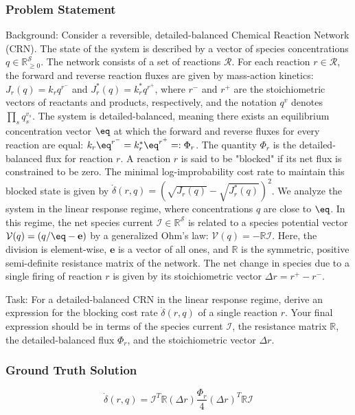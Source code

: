 \documentclass[10pt]{article}
\begin{document}
\subsubsection*{Problem Statement}
Background:
Consider a reversible, detailed-balanced Chemical Reaction Network (CRN). The state of the system is described by a vector of species concentrations $q \in \mathbb{R}^{\mathcal{S}}_{\ge 0}$. The network consists of a set of reactions $\mathcal{R}$. For each reaction $r \in \mathcal{R}$, the forward and reverse reaction fluxes are given by mass-action kinetics: $J_r(q) = k_r q^{r^-}$ and $J_r^*(q) = k_r^* q^{r^+}$, where $r^-$ and $r^+$ are the stoichiometric vectors of reactants and products, respectively, and the notation $q^{v}$ denotes $\prod_s q_s^{v_s}$. The system is detailed-balanced, meaning there exists an equilibrium concentration vector $\eq$ at which the forward and reverse fluxes for every reaction are equal: $k_r \eq^{r^-} = k_r^* \eq^{r^+} =: \Phi_r$. The quantity $\Phi_r$ is the detailed-balanced flux for reaction $r$. A reaction $r$ is said to be "blocked" if its net flux is constrained to be zero. The minimal log-improbability cost rate to maintain this blocked state is given by $\dot{\delta}(r,q) = (\sqrt{J_r(q)}-\sqrt{J_r^*(q)})^2$. We analyze the system in the linear response regime, where concentrations $q$ are close to $\eq$. In this regime, the net species current $\mathcal{I} \in \mathbb{R}^{\mathcal{S}}$ is related to a species potential vector $\mathcal{V}(q) = (q/\eq - \mathbf{e})$ by a generalized Ohm's law: $\mathcal{V}(q) = -\mathbb{R}\mathcal{I}$. Here, the division is element-wise, $\mathbf{e}$ is a vector of all ones, and $\mathbb{R}$ is the symmetric, positive semi-definite resistance matrix of the network. The net change in species due to a single firing of reaction $r$ is given by its stoichiometric vector $\Delta r = r^+ - r^-$. 

Task:
For a detailed-balanced CRN in the linear response regime, derive an expression for the blocking cost rate $\dot{\delta}(r,q)$ of a single reaction $r$. Your final expression should be in terms of the species current $\mathcal{I}$, the resistance matrix $\mathbb{R}$, the detailed-balanced flux $\Phi_r$, and the stoichiometric vector $\Delta r$.

\subsubsection*{Ground Truth Solution}
\[ \boxed{\dot{\delta}(r,q) = \mathcal{I}^T \mathbb{R}  (\Delta r)\frac{\Phi_r}{4} (\Delta r)^T \mathbb{R} \mathcal{I}} \]
\end{document}
